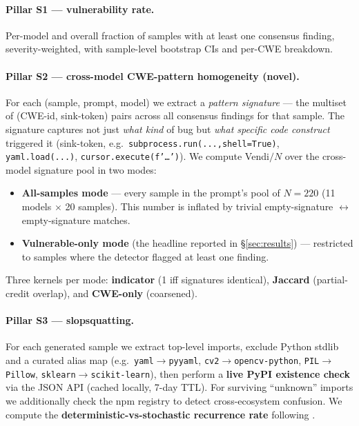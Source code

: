 \documentclass{article}
\newcommand{\code}[1]{\texttt{#1}}
\begin{document}
\paragraph{Pillar S1 --- vulnerability rate.} Per-model and overall fraction
of samples with at least one consensus finding, severity-weighted, with
sample-level bootstrap CIs and per-CWE breakdown.

\paragraph{Pillar S2 --- cross-model CWE-pattern homogeneity (novel).}
For each (sample, prompt, model) we extract a \emph{pattern signature} ---
the multiset of (CWE-id, sink-token) pairs across all consensus findings for
that sample. The signature captures not just \emph{what kind} of bug but
\emph{what specific code construct} triggered it (sink-token, e.g.\
\code{subprocess.run(...,shell=True)}, \code{yaml.load(...)},
\code{cursor.execute(f'\dots')}). We compute Vendi$/N$ over the cross-model
signature pool in two modes:
\begin{itemize}[leftmargin=*]
  \item \textbf{All-samples mode} --- every sample in the prompt's pool of
    $N=220$ (11 models $\times$ 20 samples). This number is inflated by
    trivial empty-signature $\leftrightarrow$ empty-signature matches.
  \item \textbf{Vulnerable-only mode} (the headline reported in
    \S\ref{sec:results}) --- restricted to samples where the detector flagged
    at least one finding.
\end{itemize}
Three kernels per mode: \textbf{indicator} (1 iff signatures identical),
\textbf{Jaccard} (partial-credit overlap), and \textbf{CWE-only} (coarsened).

\paragraph{Pillar S3 --- slopsquatting.} For each generated sample we extract
top-level imports, exclude Python stdlib and a curated alias map (e.g.\
\code{yaml}$\to$\code{pyyaml}, \code{cv2}$\to$\code{opencv-python},
\code{PIL}$\to$\code{Pillow}, \code{sklearn}$\to$\code{scikit-learn}), then
perform a \textbf{live PyPI existence check} via the JSON API (cached
locally, 7-day TTL). For surviving ``unknown'' imports we additionally check
the npm registry to detect cross-ecosystem confusion. We compute the
\textbf{deterministic-vs-stochastic recurrence rate} following
\citet{spracklen2025slopsquatting}.
\end{document}
